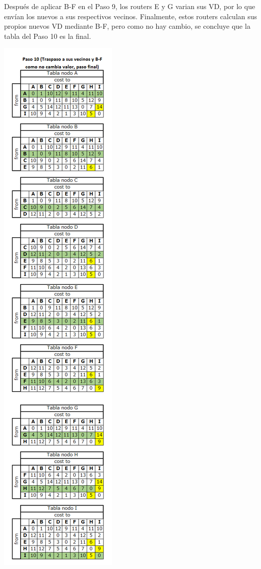 \documentclass{article}
\begin{document}
Después de aplicar B-F en el Paso 9, los routers E y G varian sus VD, por lo que envían los nuevos a sus respectivos vecinos. Finalmente, estos routers calculan sus propios nuevos VD mediante B-F, pero como no hay cambio, se concluye que la tabla del Paso 10 es la final.\\
\centerline{\includegraphics[scale=0.5]{Img/paso10.png}}\\
\end{document}
